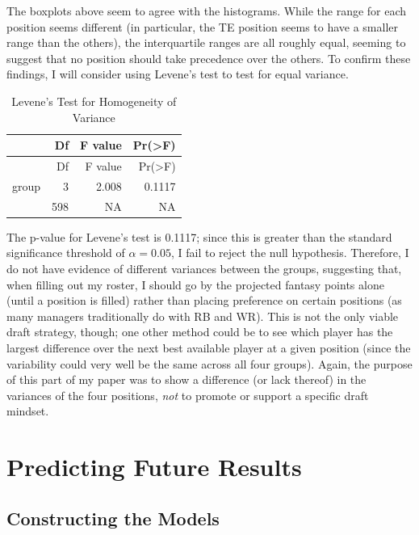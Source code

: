 \documentclass[
]{article}
\begin{document}
The boxplots above seem to agree with the histograms. While the range
for each position seems different (in particular, the TE position seems
to have a smaller range than the others), the interquartile ranges are
all roughly equal, seeming to suggest that no position should take
precedence over the others. To confirm these findings, I will consider
using Levene's test to test for equal variance.

\begin{longtable}[]{@{}lrrr@{}}
\caption{Levene's Test for Homogeneity of Variance}\tabularnewline
\toprule
& Df & F value & Pr(\textgreater F) \\
\midrule
\endfirsthead
\toprule
& Df & F value & Pr(\textgreater F) \\
\midrule
\endhead
group & 3 & 2.008 & 0.1117 \\
& 598 & NA & NA \\
\bottomrule
\end{longtable}

The p-value for Levene's test is 0.1117; since this is greater than the
standard significance threshold of \(\alpha = 0.05\), I fail to reject
the null hypothesis. Therefore, I do not have evidence of different
variances between the groups, suggesting that, when filling out my
roster, I should go by the projected fantasy points alone (until a
position is filled) rather than placing preference on certain positions
(as many managers traditionally do with RB and WR). This is not the only
viable draft strategy, though; one other method could be to see which
player has the largest difference over the next best available player at
a given position (since the variability could very well be the same
across all four groups). Again, the purpose of this part of my paper was
to show a difference (or lack thereof) in the variances of the four
positions, \emph{not} to promote or support a specific draft mindset.

\newpage

\hypertarget{predicting-future-results}{%
\section{Predicting Future Results}\label{predicting-future-results}}

\hypertarget{constructing-the-models}{%
\subsection{Constructing the Models}\label{constructing-the-models}}
\end{document}
